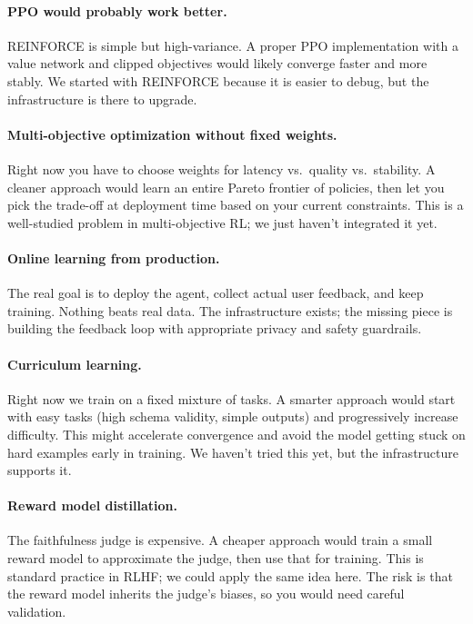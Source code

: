 \documentclass[11pt]{article}
\begin{document}
\paragraph{PPO would probably work better.}
REINFORCE is simple but high-variance.
A proper PPO implementation with a value network and clipped objectives would likely converge faster and more stably.
We started with REINFORCE because it is easier to debug, but the infrastructure is there to upgrade.

\paragraph{Multi-objective optimization without fixed weights.}
Right now you have to choose weights for latency vs.\ quality vs.\ stability.
A cleaner approach would learn an entire Pareto frontier of policies, then let you pick the trade-off at deployment time based on your current constraints.
This is a well-studied problem in multi-objective RL; we just haven't integrated it yet.

\paragraph{Online learning from production.}
The real goal is to deploy the agent, collect actual user feedback, and keep training.
Nothing beats real data.
The infrastructure exists; the missing piece is building the feedback loop with appropriate privacy and safety guardrails.

\paragraph{Curriculum learning.}
Right now we train on a fixed mixture of tasks.
A smarter approach would start with easy tasks (high schema validity, simple outputs) and progressively increase difficulty.
This might accelerate convergence and avoid the model getting stuck on hard examples early in training.
We haven't tried this yet, but the infrastructure supports it.

\paragraph{Reward model distillation.}
The faithfulness judge is expensive.
A cheaper approach would train a small reward model to approximate the judge, then use that for training.
This is standard practice in RLHF; we could apply the same idea here.
The risk is that the reward model inherits the judge's biases, so you would need careful validation.
\end{document}
